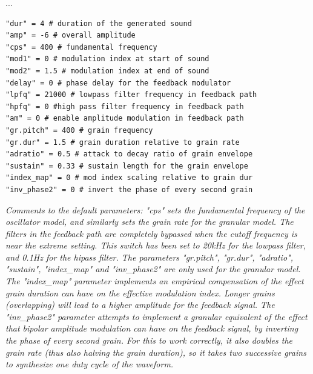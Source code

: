 \documentclass[runningheads,a4paper]{llncs}
\begin{document}
...


\noindent\begin{minipage}{\linewidth}
\begin{lstlisting}[caption=Default parameters for the synthesis models, label=lst:defaultparameters]
"dur" = 4 # duration of the generated sound
"amp" = -6 # overall amplitude
"cps" = 400 # fundamental frequency 
"mod1" = 0 # modulation index at start of sound
"mod2" = 1.5 # modulation index at end of sound
"delay" = 0 # phase delay for the feedback modulator
"lpfq" = 21000 # lowpass filter frequency in feedback path
"hpfq" = 0 #high pass filter frequency in feedback path
"am" = 0 # enable amplitude modulation in feedback path
"gr.pitch" = 400 # grain frequency 
"gr.dur" = 1.5 # grain duration relative to grain rate
"adratio" = 0.5 # attack to decay ratio of grain envelope
"sustain" = 0.33 # sustain length for the grain envelope
"index_map" = 0 # mod index scaling relative to grain dur
"inv_phase2" = 0 # invert the phase of every second grain
	\end{lstlisting}
		\emph{Comments to the default parameters: "cps" sets the fundamental frequency of the oscillator model, and similarly sets the grain rate for the granular model. The filters in the feedback path are completely bypassed when the cutoff frequency is near the extreme setting. This switch has been set to 20kHz for the lowpass filter, and 0.1Hz for the hipass filter. The parameters "gr.pitch", "gr.dur", "adratio", "sustain", "index\_map" and "inv\_phase2" are only used for the granular model. The "index\_map" parameter implements an empirical compensation of the effect grain duration can have on the effective modulation index. Longer grains (overlapping) will lead to a higher amplitude for the feedback signal. The "inv\_phase2" parameter attempts to implement a granular equivalent of the effect that bipolar amplitude modulation can have on the feedback signal, by inverting the phase of every second grain. For this to work correctly, it also doubles the grain rate (thus also halving the grain duration), so it takes two successive grains to synthesize one duty cycle of the waveform.}
	
\end{minipage}
\end{document}
